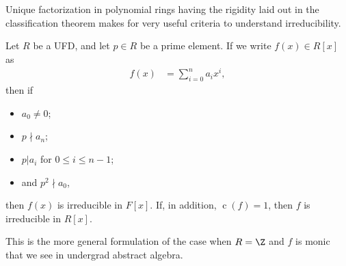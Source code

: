 \documentclass[10pt]{mypackage}
\begin{document}
Unique factorization in polynomial rings having the rigidity laid out in the classification theorem makes for very useful criteria to understand irreducibility.
\begin{theorem}
  Let $R$ be a UFD, and let $p\in R$ be a prime element. If we write $f(x)\in R[x]$ as
  \begin{align*}
    f(x) &= \sum_{i=0}^{n}a_ix^{i},
  \end{align*}
  then if
  \begin{itemize}
    \item $a_0\neq 0$;
    \item $p \nmid a_n$;
    \item $p | a_i$ for $0 \leq i \leq n-1$;
    \item and $p^2 \nmid a_0$,
  \end{itemize}
  then $f(x)$ is irreducible in $F[x]$. If, in addition, $\operatorname{c}(f) = 1$, then $f$ is irreducible in $R[x]$.
\end{theorem}
\begin{remark}
  This is the more general formulation of the case when $R = \Z$ and $f$ is monic that we see in undergrad abstract algebra.
\end{remark}
\end{document}
